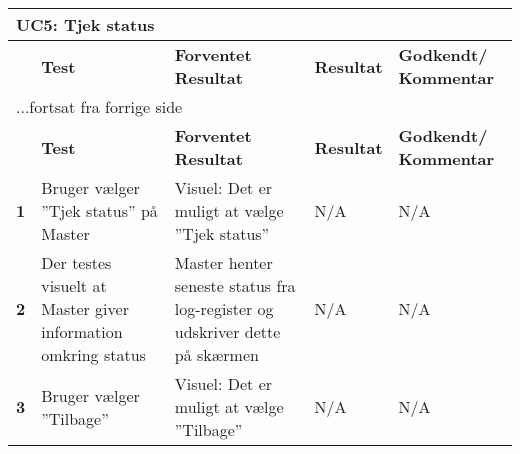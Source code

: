 \begin{center}
\begin{longtable}{|p{}|p{}|p{}|p{}|p{}|} %
\hline
\multicolumn{5}{|l|}{\textbf{UC5: Tjek status}} \\ \hline
\multicolumn{1}{|c|}{} &
\textbf{Test} &
\textbf{Forventet \newline Resultat} &
\textbf{Resultat} &
\textbf{Godkendt/ \newline Kommentar} \\ \hline 
\endfirsthead

\multicolumn{5}{l}{...fortsat fra forrige side} \\ \hline 
\multicolumn{1}{|c|}{} &
\textbf{Test} &
\textbf{Forventet \newline Resultat} &
\textbf{Resultat} &
\textbf{Godkendt/ \newline Kommentar} \\ \hline 
\endhead

\textbf{1}	&Bruger vælger ''Tjek status'' på Master
			&Visuel: Det er muligt at vælge ''Tjek status''
			&N/A
			&N/A \\ \hline 
			
\textbf{2}	&Der testes visuelt at Master giver information omkring status 
			&Master henter seneste status fra log-register og udskriver dette på skærmen
			&N/A
			&N/A \\ \hline 

\textbf{3}	&Bruger vælger ''Tilbage''
			&Visuel: Det er muligt at vælge ''Tilbage''
			&N/A
			&N/A \\ \hline 
			
\end{longtable}
	\label{ATUC7} 
\end{center}
